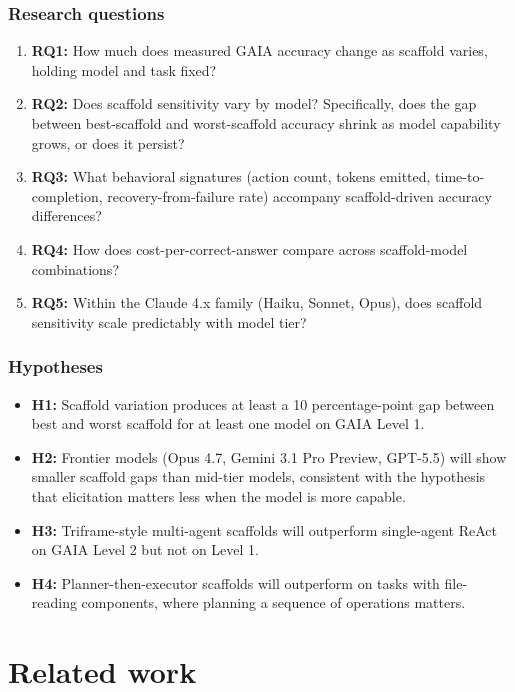 \documentclass[10pt]{article} %
\begin{document}
        \subsubsection{Research questions}
        \begin{enumerate}
            \item \textbf{RQ1:} How much does measured GAIA accuracy change as scaffold varies, holding model and task fixed?
            \item \textbf{RQ2:} Does scaffold sensitivity vary by model? Specifically, does the gap between best-scaffold and worst-scaffold accuracy shrink as model capability grows, or does it persist?
            \item \textbf{RQ3:} What behavioral signatures (action count, tokens emitted, time-to-completion, recovery-from-failure rate) accompany scaffold-driven accuracy differences?
            \item \textbf{RQ4:} How does cost-per-correct-answer compare across scaffold-model combinations?
            \item \textbf{RQ5:} Within the Claude 4.x family (Haiku, Sonnet, Opus), does scaffold sensitivity scale predictably with model tier?
        \end{enumerate}
    
        \subsubsection{Hypotheses}
        \begin{itemize}
            \item \textbf{H1: }Scaffold variation produces at least a 10 percentage-point gap between best and worst scaffold for at least one model on GAIA Level 1.
            \item \textbf{H2: }Frontier models (Opus 4.7, Gemini 3.1 Pro Preview, GPT-5.5) will show smaller scaffold gaps than mid-tier models, consistent with the hypothesis that elicitation matters less when the model is more capable.
            \item \textbf{H3: }Triframe-style multi-agent scaffolds will outperform single-agent ReAct on GAIA Level 2 but not on Level 1.
            \item \textbf{H4: }Planner-then-executor scaffolds will outperform on tasks with file-reading components, where planning a sequence of operations matters.
        \end{itemize}   

\section{Related work}\label{sec:related_work}
\end{document}
